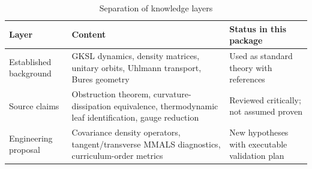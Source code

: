 \begin{table}[H]
\centering
\caption{Separation of knowledge layers}
\begin{tabularx}{\textwidth}{p{} X X}
\toprule
\textbf{Layer} & \textbf{Content} & \textbf{Status in this package} \\
\midrule
Established background & GKSL dynamics, density matrices, unitary orbits, Uhlmann transport, Bures geometry & Used as standard theory with references \\
Source claims & Obstruction theorem, curvature-dissipation equivalence, thermodynamic leaf identification, gauge reduction & Reviewed critically; not assumed proven \\
Engineering proposal & Covariance density operators, tangent/transverse MMALS diagnostics, curriculum-order metrics & New hypotheses with executable validation plan \\
\bottomrule
\end{tabularx}
\end{table}

